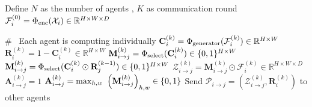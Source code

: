\begin{algorithm}[!t]
	\caption{Multi-round spatial confidence-aware collaborative perception system} 
	\begin{algorithmic}[1]
	    \State Define $N$ as the number of agents , $K$ as communication round
	    \State {\color{blue} { \#~Initialization}}
	        \State $\mathcal{F}_{i}^{(0)}=\Phi_{\rm enc}(\mathcal{X}_i) \in \mathbb{R}^{H\times W \times D}$
	    \EndFor
	    
	          {\color{blue} { \#~ Each agent is computing individually}} 
	            \State $\mathbf{C}_{i}^{(k)} = \Phi_{\rm generator}(\mathcal{F}_{i}^{(k)})\in \mathbb{R}^{H\times W}$ 
	                \State {\color{blue} { \#~Message packing}} 
	                \State $\mathbf{R}_{i}^{(k)}=1 - \mathbf{C}_i^{(k)}\in \mathbb{R}^{H\times W}$ 
    	                \State $\mathbf{M}_{i\rightarrow j}^{(k)}=\Phi_{\rm select}(\mathbf{C}_{i}^{(k)})\in \{0, 1\}^{H\times W}$ 
    	            \Else
    	                \State $\mathbf{M}_{i\rightarrow j}^{(k)}=\Phi_{\rm select}(\mathbf{C}_{i}^{(k)}\odot \mathbf{R}_{j}^{(k-1)} ) \in \{0, 1\}^{H\times W}$ 
	                \EndIf
	                \State $\mathcal{Z}_{i\rightarrow j}^{(k)}=\mathbf{M}_{i\rightarrow j}^{(k)}\odot \mathcal{F}_i^{(k)} \in \mathbb{R}^{H\times W \times D}$
	                \State {\color{blue} { \#~Communication graph learning }}
    	                \State $\mathbf{A}_{i\rightarrow j}^{(k)}=1$ 
    	            \Else
    	                \State $\mathbf{A}_{i\rightarrow j}^{(k)}={\rm max}_{h,w}~ \left( \mathbf{M}_{i\rightarrow j}^{(k)} \right)_{h,w} \in \{0, 1\}$
    	            \EndIf
    	        \EndFor
    	        \State {\color{blue} { \#~Communication}} \State Send $\mathcal{P}_{i\rightarrow j} = \left(\mathcal{Z}_{i\rightarrow j}^{(k)},\mathbf{R}_i^{(k)} \right)$ to other agents

\end{algorithmic}
\end{algorithm}
